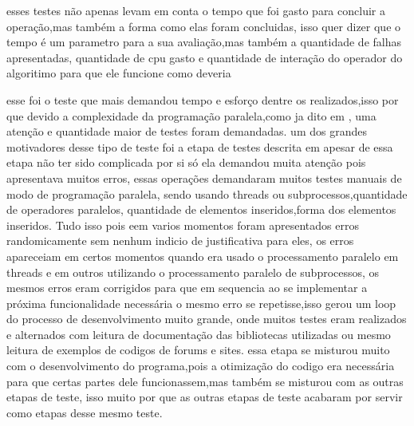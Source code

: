 \documentclass[
	12pt,				%
	openright,			%
	oneside,			%
	a4paper,			%
	english,			%
	french,				%
	spanish,			%
	brazil,				%
	]{abntex2}
\begin{document}
esses testes não apenas levam em conta o tempo que foi gasto para concluir a operação,mas também a forma como elas foram concluidas,
isso quer dizer que o tempo é um parametro para a sua avaliação,mas também a quantidade de falhas apresentadas,
quantidade de cpu gasto e quantidade de interação do operador do algoritimo para que ele funcione como deveria

esse foi o teste que mais demandou tempo e esforço dentre os realizados,isso por que devido a complexidade da programação paralela,como ja dito em , uma atenção e quantidade maior de testes foram demandadas.
um dos grandes motivadores desse tipo de teste foi a etapa de testes descrita em  apesar de essa etapa não ter sido complicada por si só ela demandou muita atenção pois apresentava muitos erros,
essas operações demandaram muitos testes manuais de modo de programação paralela,
sendo usando threads ou subprocessos,quantidade de operadores paralelos,
quantidade de elementos inseridos,forma dos elementos inseridos.
Tudo isso pois eem varios momentos foram apresentados erros randomicamente sem nenhum indicio de justificativa para eles,
os erros apareceiam em certos momentos quando era usado o processamento paralelo em threads e em outros utilizando o processamento paralelo de subprocessos,
os mesmos erros eram corrigidos para que em sequencia ao se implementar a próxima funcionalidade necessária o mesmo erro se repetisse,isso gerou um loop do processo de desenvolvimento muito grande,
onde muitos testes eram realizados e alternados com leitura de documentação das bibliotecas utilizadas ou mesmo leitura de exemplos de codigos de forums e sites.
essa etapa se misturou muito com o desenvolvimento do programa,pois a otimização do codigo era necessária para que certas partes dele funcionassem,mas também se misturou com as outras etapas de teste,
isso muito por que as outras etapas de teste acabaram por servir como etapas desse mesmo teste.
\end{document}
